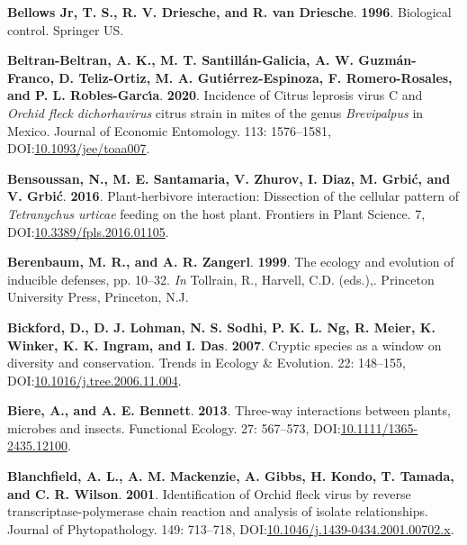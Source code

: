 \documentclass[12pt,final,CPage]{ufthesis}
\newlength{\cslhangindent}
\newenvironment{CSLReferences}[2] %
{%
	\setlength{\parindent}{0pt}
	\ifodd #1 \everypar{\setlength{\hangindent}{\cslhangindent}}\ignorespaces\fi
	\ifnum #2 > 0
	\setlength{\parskip}{#2\baselineskip}
	\fi
}%
{}
\begin{document}
{\begin{CSLReferences}{1}{0}
  \leavevmode{}%
  \textbf{Bellows Jr, T. S., R. V. Driesche, and R. van Driesche}. \textbf{1996}. Biological control. Springer US.

  \leavevmode{}%
  \textbf{Beltran-Beltran, A. K., M. T. Santillán-Galicia, A. W. Guzmán-Franco, D. Teliz-Ortiz, M. A. Gutiérrez-Espinoza, F. Romero-Rosales, and P. L. Robles-Garcı́a}. \textbf{2020}. Incidence of {Citrus leprosis virus} {C} and {\emph{Orchid fleck dichorhavirus}} citrus strain in mites of the genus {\emph{Brevipalpus}} in {Mexico}. Journal of Economic Entomology. 113: 1576--1581, DOI:\href{https://doi.org/10.1093/jee/toaa007}{10.1093/jee/toaa007}.

  \leavevmode{}%
  \textbf{Bensoussan, N., M. E. Santamaria, V. Zhurov, I. Diaz, M. Grbić, and V. Grbić}. \textbf{2016}. Plant-herbivore interaction: Dissection of the cellular pattern of {\emph{Tetranychus urticae}} feeding on the host plant. Frontiers in Plant Science. 7, DOI:\href{https://doi.org/10.3389/fpls.2016.01105}{10.3389/fpls.2016.01105}.

  \leavevmode{}%
  \textbf{Berenbaum, M. R., and A. R. Zangerl}. \textbf{1999}. The ecology and evolution of inducible defenses, pp. 10--32. \emph{In} Tollrain, R., Harvell, C.D. (eds.),. Princeton University Press, Princeton, N.J.

  \leavevmode{}%
  \textbf{Bickford, D., D. J. Lohman, N. S. Sodhi, P. K. L. Ng, R. Meier, K. Winker, K. K. Ingram, and I. Das}. \textbf{2007}. Cryptic species as a window on diversity and conservation. Trends in Ecology {\&} Evolution. 22: 148--155, DOI:\href{https://doi.org/10.1016/j.tree.2006.11.004}{10.1016/j.tree.2006.11.004}.

  \leavevmode{}%
  \textbf{Biere, A., and A. E. Bennett}. \textbf{2013}. Three-way interactions between plants, microbes and insects. Functional Ecology. 27: 567--573, DOI:\href{https://doi.org/10.1111/1365-2435.12100}{10.1111/1365-2435.12100}.

  \leavevmode{}%
  \textbf{Blanchfield, A. L., A. M. Mackenzie, A. Gibbs, H. Kondo, T. Tamada, and C. R. Wilson}. \textbf{2001}. Identification of {Orchid fleck virus} by reverse transcriptase-polymerase chain reaction and analysis of isolate relationships. Journal of Phytopathology. 149: 713--718, DOI:\href{https://doi.org/10.1046/j.1439-0434.2001.00702.x}{10.1046/j.1439-0434.2001.00702.x}.


\end{CSLReferences}}
\end{document}
